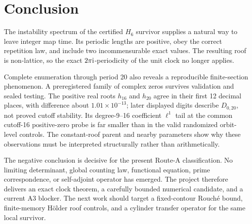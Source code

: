 \section{Conclusion}
\label{sec:conclusion}

The instability spectrum of the certified \(H_6\) survivor supplies a natural
way to leave integer map time.  Its periodic lengths are positive, obey the
correct repetition law, and include two incommensurable exact values.  The
resulting roof is non-lattice, so the exact \(2\pi\mathrm{i}\)-periodicity of the unit
clock no longer applies.

Complete enumeration through period 20 also reveals a reproducible
finite-section phenomenon.  A preregistered family of complex zeros survives
validation and sealed testing.  The positive real roots \(h_{16}\) and
\(h_{20}\) agree in their first 12 decimal places, with difference about
\(1.01\times10^{-13}\); later displayed digits describe \(D_{0,20}\), not
proved cutoff stability.  Its degree-9--16 coefficient \(\ell^1\) tail at the
common cutoff-16 positive-zero probe is far smaller than in the valid
randomized orbit-level controls.  The constant-roof parent and nearby
parameters show why these observations must be interpreted structurally rather
than arithmetically.

The negative conclusion is decisive for the present Route-A classification.
No
limiting determinant, global counting law, functional equation, prime
correspondence, or self-adjoint operator has emerged.  The project therefore
delivers an exact clock theorem, a carefully bounded numerical candidate, and
a current A3 blocker.  The next work should target a fixed-contour
Rouch\'e bound, finite-memory H\"older roof controls, and a cylinder transfer
operator for the same local survivor.
